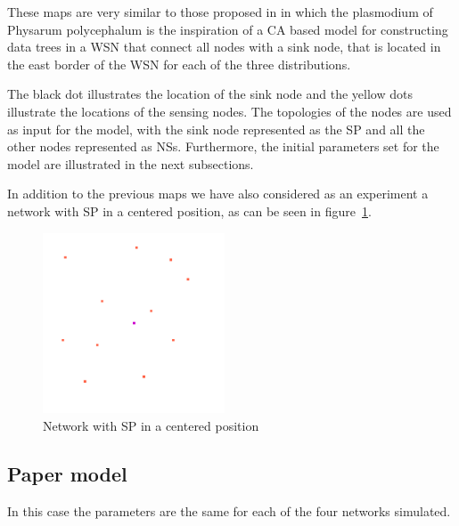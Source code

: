 These maps are very similar to those proposed in \cite{tsompanas2015cellular} in which the plasmodium of Physarum polycephalum is the inspiration of a CA based model for constructing data trees in a WSN that connect all nodes with a sink node, that is located in the east border of the WSN for each of the three distributions.

\par
The black dot illustrates the location of the sink node and the yellow dots illustrate the locations of the sensing nodes. The topologies of the nodes are used as input for the model, with the sink node represented as the SP and all the other nodes represented as NSs. Furthermore, the initial parameters set for the model are illustrated in the next subsections.

\par
In addition to the previous maps we have also considered as an experiment a network with SP in a centered position, as can be seen in figure~\ref{fig:central_sp_exp/1_central_sp}.

\begin{figure}
  \centering
    \includegraphics[width=0.48\textwidth]{central_sp_exp/1_central_sp}%
    
  \caption{Network with SP in a centered position}
  \label{fig:central_sp_exp/1_central_sp}
\end{figure}

\subsection{Paper model}

In this case the parameters are the same for each of the four networks simulated.

